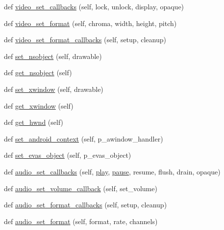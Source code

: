 \begin{DoxyCompactItemize}
def \hyperlink{classvlc_1_1_media_player_a403510f3a743d0f553a5eaf83db7a0dc}{video\+\_\+set\+\_\+callbacks} (self, lock, unlock, display, opaque)
\item 
def \hyperlink{classvlc_1_1_media_player_aaa29bcd8c914e465dea43f8fc19fade4}{video\+\_\+set\+\_\+format} (self, chroma, width, height, pitch)
\item 
def \hyperlink{classvlc_1_1_media_player_a4e34ac0318b11492555047b9d271a8d6}{video\+\_\+set\+\_\+format\+\_\+callbacks} (self, setup, cleanup)
\item 
def \hyperlink{classvlc_1_1_media_player_a569de1fbcc475f3eef8dbf4e938851a6}{set\+\_\+nsobject} (self, drawable)
\item 
def \hyperlink{classvlc_1_1_media_player_aa4c7fba6bb178e5df3d8ff9262fd9e86}{get\+\_\+nsobject} (self)
\item 
def \hyperlink{classvlc_1_1_media_player_aef02cae4b8abcf9618bfd14e5af73c07}{set\+\_\+xwindow} (self, drawable)
\item 
def \hyperlink{classvlc_1_1_media_player_a8ec246f66e5d2c300931d6748fa72cbf}{get\+\_\+xwindow} (self)
\item 
def \hyperlink{classvlc_1_1_media_player_af545adff837a9f6c8bfd31b70854cde7}{get\+\_\+hwnd} (self)
\item 
def \hyperlink{classvlc_1_1_media_player_aa5b3842814a612f4999f1bc01f95b6d4}{set\+\_\+android\+\_\+context} (self, p\+\_\+awindow\+\_\+handler)
\item 
def \hyperlink{classvlc_1_1_media_player_ad03f3853ac2685e1a62ca0f98121a1df}{set\+\_\+evas\+\_\+object} (self, p\+\_\+evas\+\_\+object)
\item 
def \hyperlink{classvlc_1_1_media_player_a327e9a7e6662ac47c17b3495a506ef38}{audio\+\_\+set\+\_\+callbacks} (self, \hyperlink{classvlc_1_1_media_player_a9942567d8012950a20b0798b4203bb57}{play}, \hyperlink{classvlc_1_1_media_player_aee7a4c35e3232c131ff62b5866eb4a16}{pause}, resume, flush, drain, opaque)
\item 
def \hyperlink{classvlc_1_1_media_player_a3fd19a06fa06a933d41903bfb219af6d}{audio\+\_\+set\+\_\+volume\+\_\+callback} (self, set\+\_\+volume)
\item 
def \hyperlink{classvlc_1_1_media_player_abe86fe67c8a476ce81fa2cdc67182843}{audio\+\_\+set\+\_\+format\+\_\+callbacks} (self, setup, cleanup)
\item 
def \hyperlink{classvlc_1_1_media_player_adc106c83f7c6be94fcd6dcbe6242f72e}{audio\+\_\+set\+\_\+format} (self, format, rate, channels)
\item 

\end{DoxyCompactItemize}
